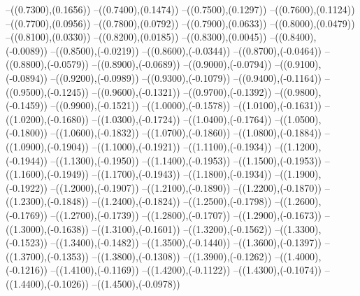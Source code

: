 {	--({\sx*(0.7300)},{\sy*(0.1656)})
	--({\sx*(0.7400)},{\sy*(0.1474)})
	--({\sx*(0.7500)},{\sy*(0.1297)})
	--({\sx*(0.7600)},{\sy*(0.1124)})
	--({\sx*(0.7700)},{\sy*(0.0956)})
	--({\sx*(0.7800)},{\sy*(0.0792)})
	--({\sx*(0.7900)},{\sy*(0.0633)})
	--({\sx*(0.8000)},{\sy*(0.0479)})
	--({\sx*(0.8100)},{\sy*(0.0330)})
	--({\sx*(0.8200)},{\sy*(0.0185)})
	--({\sx*(0.8300)},{\sy*(0.0045)})
	--({\sx*(0.8400)},{\sy*(-0.0089)})
	--({\sx*(0.8500)},{\sy*(-0.0219)})
	--({\sx*(0.8600)},{\sy*(-0.0344)})
	--({\sx*(0.8700)},{\sy*(-0.0464)})
	--({\sx*(0.8800)},{\sy*(-0.0579)})
	--({\sx*(0.8900)},{\sy*(-0.0689)})
	--({\sx*(0.9000)},{\sy*(-0.0794)})
	--({\sx*(0.9100)},{\sy*(-0.0894)})
	--({\sx*(0.9200)},{\sy*(-0.0989)})
	--({\sx*(0.9300)},{\sy*(-0.1079)})
	--({\sx*(0.9400)},{\sy*(-0.1164)})
	--({\sx*(0.9500)},{\sy*(-0.1245)})
	--({\sx*(0.9600)},{\sy*(-0.1321)})
	--({\sx*(0.9700)},{\sy*(-0.1392)})
	--({\sx*(0.9800)},{\sy*(-0.1459)})
	--({\sx*(0.9900)},{\sy*(-0.1521)})
	--({\sx*(1.0000)},{\sy*(-0.1578)})
	--({\sx*(1.0100)},{\sy*(-0.1631)})
	--({\sx*(1.0200)},{\sy*(-0.1680)})
	--({\sx*(1.0300)},{\sy*(-0.1724)})
	--({\sx*(1.0400)},{\sy*(-0.1764)})
	--({\sx*(1.0500)},{\sy*(-0.1800)})
	--({\sx*(1.0600)},{\sy*(-0.1832)})
	--({\sx*(1.0700)},{\sy*(-0.1860)})
	--({\sx*(1.0800)},{\sy*(-0.1884)})
	--({\sx*(1.0900)},{\sy*(-0.1904)})
	--({\sx*(1.1000)},{\sy*(-0.1921)})
	--({\sx*(1.1100)},{\sy*(-0.1934)})
	--({\sx*(1.1200)},{\sy*(-0.1944)})
	--({\sx*(1.1300)},{\sy*(-0.1950)})
	--({\sx*(1.1400)},{\sy*(-0.1953)})
	--({\sx*(1.1500)},{\sy*(-0.1953)})
	--({\sx*(1.1600)},{\sy*(-0.1949)})
	--({\sx*(1.1700)},{\sy*(-0.1943)})
	--({\sx*(1.1800)},{\sy*(-0.1934)})
	--({\sx*(1.1900)},{\sy*(-0.1922)})
	--({\sx*(1.2000)},{\sy*(-0.1907)})
	--({\sx*(1.2100)},{\sy*(-0.1890)})
	--({\sx*(1.2200)},{\sy*(-0.1870)})
	--({\sx*(1.2300)},{\sy*(-0.1848)})
	--({\sx*(1.2400)},{\sy*(-0.1824)})
	--({\sx*(1.2500)},{\sy*(-0.1798)})
	--({\sx*(1.2600)},{\sy*(-0.1769)})
	--({\sx*(1.2700)},{\sy*(-0.1739)})
	--({\sx*(1.2800)},{\sy*(-0.1707)})
	--({\sx*(1.2900)},{\sy*(-0.1673)})
	--({\sx*(1.3000)},{\sy*(-0.1638)})
	--({\sx*(1.3100)},{\sy*(-0.1601)})
	--({\sx*(1.3200)},{\sy*(-0.1562)})
	--({\sx*(1.3300)},{\sy*(-0.1523)})
	--({\sx*(1.3400)},{\sy*(-0.1482)})
	--({\sx*(1.3500)},{\sy*(-0.1440)})
	--({\sx*(1.3600)},{\sy*(-0.1397)})
	--({\sx*(1.3700)},{\sy*(-0.1353)})
	--({\sx*(1.3800)},{\sy*(-0.1308)})
	--({\sx*(1.3900)},{\sy*(-0.1262)})
	--({\sx*(1.4000)},{\sy*(-0.1216)})
	--({\sx*(1.4100)},{\sy*(-0.1169)})
	--({\sx*(1.4200)},{\sy*(-0.1122)})
	--({\sx*(1.4300)},{\sy*(-0.1074)})
	--({\sx*(1.4400)},{\sy*(-0.1026)})
	--({\sx*(1.4500)},{\sy*(-0.0978)})
}
